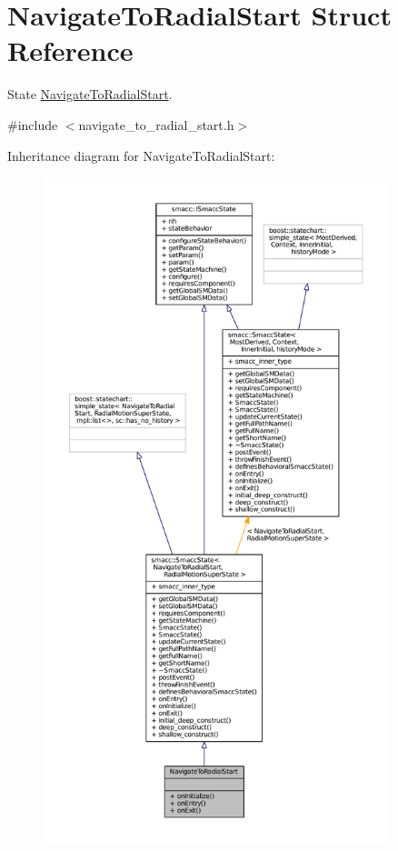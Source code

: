 \hypertarget{structNavigateToRadialStart}{}\section{Navigate\+To\+Radial\+Start Struct Reference}
\label{structNavigateToRadialStart}


State \hyperlink{structNavigateToRadialStart}{Navigate\+To\+Radial\+Start}.  




{\ttfamily \#include $<$navigate\+\_\+to\+\_\+radial\+\_\+start.\+h$>$}



Inheritance diagram for Navigate\+To\+Radial\+Start\+:
\nopagebreak
\begin{figure}[H]
\begin{center}
\leavevmode
\includegraphics[height=550pt]{structNavigateToRadialStart__inherit__graph}
\end{center}
\end{figure}


